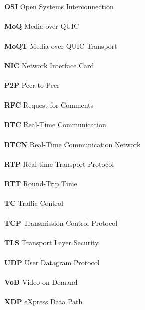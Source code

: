 \begin{tabbing}
    \\\\\textbf{OSI} \> Open Systems Interconnection
    \\\\\textbf{MoQ} \> Media over QUIC
    \\\\\textbf{MoQT} \> Media over QUIC Transport
    \\\\\textbf{NIC} \> Network Interface Card
    \\\\\textbf{P2P} \> Peer-to-Peer
    \\\\\textbf{RFC} \> Request for Comments
    \\\\\textbf{RTC} \> Real-Time Communication
    \\\\\textbf{RTCN} \> Real-Time Communication Network
    \\\\\textbf{RTP} \> Real-time Transport Protocol
    \\\\\textbf{RTT} \> Round-Trip Time
    \\\\\textbf{TC} \> Traffic Control
    \\\\\textbf{TCP} \> Transmission Control Protocol
    \\\\\textbf{TLS} \> Transport Layer Security
    \\\\\textbf{UDP} \> User Datagram Protocol
    \\\\\textbf{VoD} \> Video-on-Demand
    \\\\\textbf{XDP} \> eXpress Data Path
\end{tabbing}


